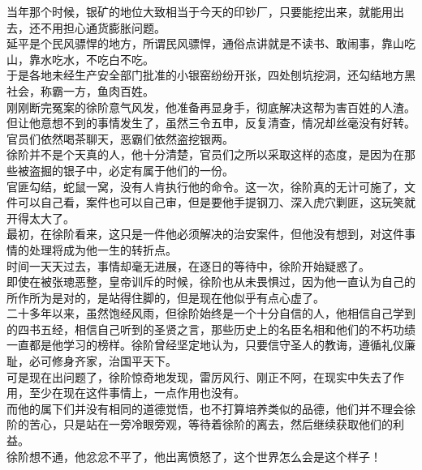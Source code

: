 \begin{multicols}{\theparacolNo}
当年那个时候，银矿的地位大致相当于今天的印钞厂，只要能挖出来，就能用出去，还不用担心通货膨胀问题。\\

延平是个民风骠悍的地方，所谓民风骠悍，通俗点讲就是不读书、敢闹事，靠山吃山，靠水吃水，不吃白不吃。\\

于是各地未经生产安全部门批准的小银窑纷纷开张，四处刨坑挖洞，还勾结地方黑社会，称霸一方，鱼肉百姓。\\

刚刚断完冤案的徐阶意气风发，他准备再显身手，彻底解决这帮为害百姓的人渣。但让他意想不到的事情发生了，虽然三令五申，反复清查，情况却丝毫没有好转。官员们依然喝茶聊天，恶霸们依然盗挖银两。\\

徐阶并不是个天真的人，他十分清楚，官员们之所以采取这样的态度，是因为在那些被盗掘的银子中，必定有属于他们的一份。\\

官匪勾结，蛇鼠一窝，没有人肯执行他的命令。这一次，徐阶真的无计可施了，文件可以自己看，案件也可以自己审，但是要他手提钢刀、深入虎穴剿匪，这玩笑就开得太大了。\\

最初，在徐阶看来，这只是一件他必须解决的治安案件，但他没有想到，对这件事情的处理将成为他一生的转折点。\\

时间一天天过去，事情却毫无进展，在逐日的等待中，徐阶开始疑惑了。\\

即使在被张璁恶整，皇帝训斥的时候，徐阶也从未畏惧过，因为他一直认为自己的所作所为是对的，是站得住脚的，但是现在他似乎有点心虚了。\\

二十多年以来，虽然饱经风雨，但徐阶始终是一个十分自信的人，他相信自己学到的四书五经，相信自己听到的圣贤之言，那些历史上的名臣名相和他们的不朽功绩一直都是他学习的榜样。徐阶曾经坚定地认为，只要信守圣人的教诲，遵循礼仪廉耻，必可修身齐家，治国平天下。\\

可是现在出问题了，徐阶惊奇地发现，雷厉风行、刚正不阿，在现实中失去了作用，至少在现在这件事情上，一点作用也没有。\\

而他的属下们并没有相同的道德觉悟，也不打算培养类似的品德，他们并不理会徐阶的苦心，只是站在一旁冷眼旁观，等待着徐阶的离去，然后继续获取他们的利益。\\

徐阶想不通，他忿忿不平了，他出离愤怒了，这个世界怎么会是这个样子！\\


\end{multicols}
